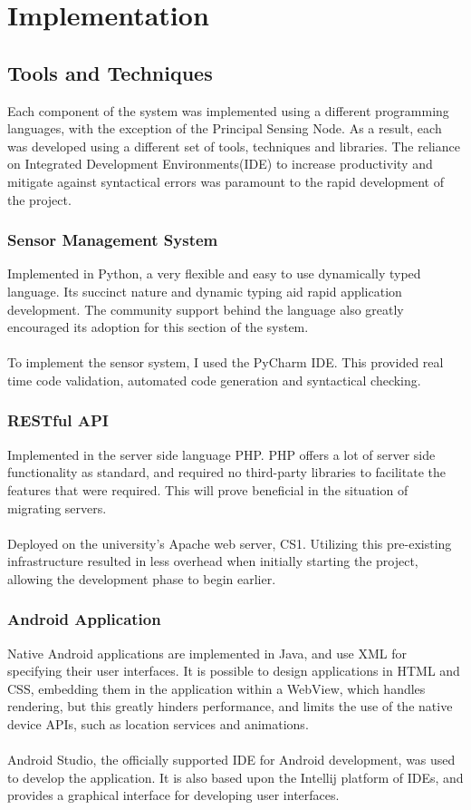 \documentclass{article}
\begin{document}
\section{Implementation	}

\subsection{Tools and Techniques}
Each component of the system was implemented using a different programming languages, with the exception of the Principal Sensing Node. As a result, each was developed using a different set of tools, techniques and libraries. The reliance on Integrated Development Environments(IDE) to increase productivity and mitigate against syntactical errors was paramount to the rapid development of the project. 

\subsubsection{Sensor Management System}

Implemented in Python, a very flexible and easy to use dynamically typed language. Its succinct nature and dynamic typing aid rapid application development. The community support behind the language also greatly encouraged its adoption for this section of the system. \\\\ To implement the sensor system, I used the PyCharm IDE. This provided real time code validation, automated code generation and syntactical checking.

\subsubsection{RESTful API}

Implemented in the server side language PHP. PHP offers a lot of server side functionality as standard, and required no third-party libraries to facilitate the features that were required. This will prove beneficial in the situation of migrating servers. \\\\ Deployed on the university’s Apache web server, CS1. Utilizing this pre-existing infrastructure resulted in less overhead when initially starting the project, allowing the development phase to begin earlier. 

\subsubsection{Android Application}
Native Android applications are implemented in Java, and use XML for specifying their user interfaces. It is possible to design applications in HTML and CSS, embedding them in the application within a WebView, which handles rendering, but this greatly hinders performance, and limits the use of the native device APIs, such as location services and animations. \\\\ Android Studio, the officially supported IDE for Android development, was used to develop the application. It is also based upon the Intellij platform of IDEs, and provides a graphical interface for developing user interfaces.  
\end{document}
